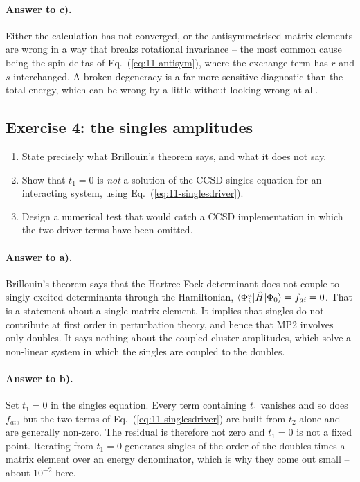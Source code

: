 \paragraph{Answer to c).}
Either the calculation has not converged, or the antisymmetrised matrix
elements are wrong in a way that breaks rotational invariance -- the most
common cause being the spin deltas of Eq.~(\ref{eq:11-antisym}), where the
exchange term has $r$ and $s$ interchanged.  A broken degeneracy is a far more
sensitive diagnostic than the total energy, which can be wrong by a little
without looking wrong at all.

\subsection*{Exercise 4: the singles amplitudes}
\label{ex:11-singles}

\begin{enumerate}
  \item[a)] State precisely what Brillouin's theorem says, and what it does
  not say.
  \item[b)] Show that $t_1=0$ is \emph{not} a solution of the CCSD singles
  equation for an interacting system, using
  Eq.~(\ref{eq:11-singlesdriver}).
  \item[c)] Design a numerical test that would catch a CCSD implementation in
  which the two driver terms have been omitted.
\end{enumerate}

\paragraph{Answer to a).}
Brillouin's theorem says that the Hartree-Fock determinant does not couple to
singly excited determinants through the Hamiltonian,
$\langle \Phi_i^a | \hat{H} | \Phi_0 \rangle=f_{ai}=0$.  That is a statement about a
single matrix element.  It implies that singles do not contribute at first
order in perturbation theory, and hence that MP2 involves only doubles.  It
says nothing about the coupled-cluster amplitudes, which solve a non-linear
system in which the singles are coupled to the doubles.

\paragraph{Answer to b).}
Set $t_1=0$ in the singles equation.  Every term containing $t_1$ vanishes and
so does $f_{ai}$, but the two terms of Eq.~(\ref{eq:11-singlesdriver}) are
built from $t_2$ alone and are generally non-zero.  The residual is therefore
not zero and $t_1=0$ is not a fixed point.  Iterating from $t_1=0$ generates
singles of the order of the doubles times a matrix element over an energy
denominator, which is why they come out small -- about $10^{-2}$ here.

